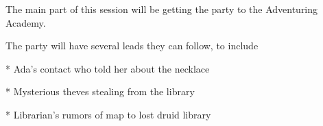 The main part of this session will be getting the party to the Adventuring Academy.

The party will have several leads they can follow, to include

* Ada's contact who told her about the necklace

* Mysterious theves stealing from the library

* Librarian's rumors of map to lost druid library
